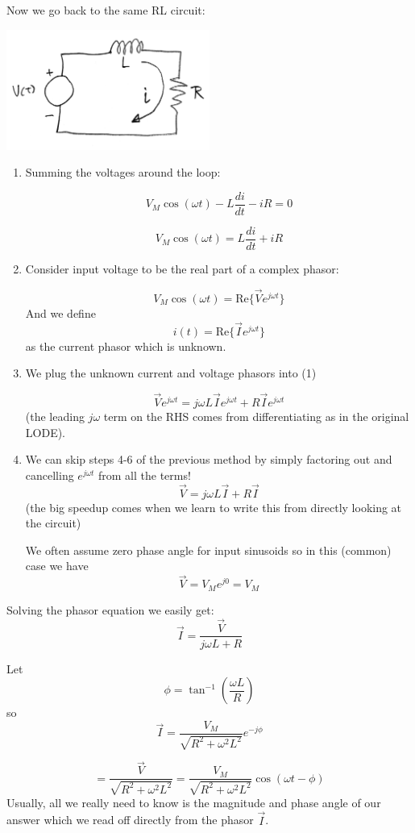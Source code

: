 \begin{ExampleSmall}\label{firstPhasorCktKVL}

Now we go back to the same RL circuit:

\includegraphics[width=0.5\textwidth]{figsChapt02/DI63347.png}

\begin{enumerate}
\item Summing the  voltages around the loop:

\[
V_M\cos(\omega t) - L\frac{di}{dt} - iR = 0
\]

\[
V_M\cos(\omega t) = L\frac{di}{dt} + iR
\]

\item Consider input voltage to be the real part of a complex phasor:

\[
V_M\cos(\omega t) = \mathrm{Re}\{ \vec{V}e^{j\omega t} \}
\]
And we define
\[
i(t) = \mathrm{Re}\{ \vec{I}e^{j\omega t}  \}
\]
as the current phasor which is
unknown.


\item We plug the unknown current and voltage phasors into (1)

\[
\vec{V}e^{j\omega t} = j\omega L\vec{I}e^{j\omega t} + R\vec{I}e^{j\omega t}
\]
(the leading $j\omega$ term on the RHS comes from differentiating as in the original LODE).


\item We can skip steps 4-6 of the previous method by
simply factoring out and cancelling $e^{j\omega t}$ from all the terms!
\[
\vec{V} = j\omega L\vec{I} + R\vec{I}
\]
(the big speedup comes when we learn to write this from
directly looking at the circuit)

We often assume zero phase angle for input sinusoids so in this (common) case we have
\[
\vec{V} =V_Me^{j0} = V_M
\]
\end{enumerate}
\end{ExampleSmall}

\begin{ExampleCont}

Solving the phasor equation we easily get:
\[
\vec{I} = \frac{\vec{V}}{  j\omega L + R}
\]

Let
\[
\phi = \tan^{-1}\left(\frac{\omega L}{R}\right)
\]
so
\[
\vec{I} = \frac{V_M}{\sqrt{R^2+\omega^2L^2}}e^{-j\phi}
\]

\[
= \frac{\vec{V}}{\sqrt{R^2+\omega^2L^2}} = \frac{V_M}{\sqrt{R^2+\omega^2L^2}}\cos(\omega t - \phi)
\]
Usually, all we really need to know is the magnitude and phase angle of our answer which we read
off directly from the phasor $\vec{I}$.
\end{ExampleCont}

